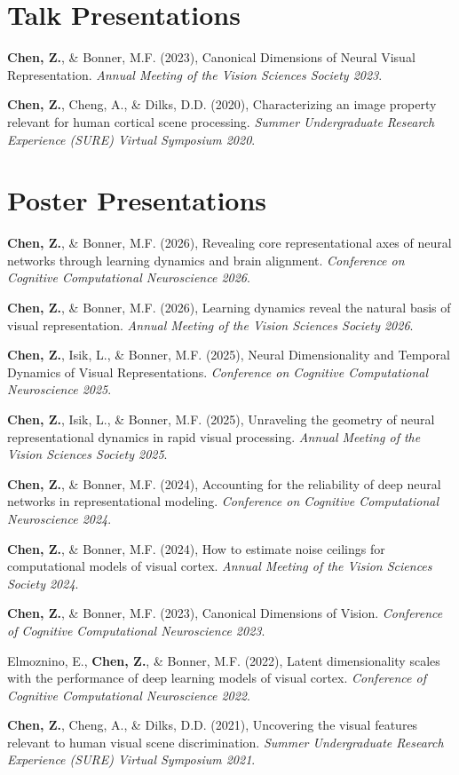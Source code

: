 \documentclass[10pt,letterpaper]{article}
\newcommand{\cit}[1]{\begingroup\hangindent=0.32in\hangafter=1 #1\par\endgroup\vspace{3pt}}
\begin{document}
\section{Talk Presentations}
\cit{\textbf{Chen, Z.}, \& Bonner, M.F. (2023), Canonical Dimensions of Neural Visual Representation. \textit{Annual Meeting of the Vision Sciences Society 2023}.}
\cit{\textbf{Chen, Z.}, Cheng, A., \& Dilks, D.D. (2020), Characterizing an image property relevant for human cortical scene processing. \textit{Summer Undergraduate Research Experience (SURE) Virtual Symposium 2020}.}

\section{Poster Presentations}
\cit{\textbf{Chen, Z.}, \& Bonner, M.F. (2026), Revealing core representational axes of neural networks through learning dynamics and brain alignment. \textit{Conference on Cognitive Computational Neuroscience 2026}.}
\cit{\textbf{Chen, Z.}, \& Bonner, M.F. (2026), Learning dynamics reveal the natural basis of visual representation. \textit{Annual Meeting of the Vision Sciences Society 2026}.}
\cit{\textbf{Chen, Z.}, Isik, L., \& Bonner, M.F. (2025), Neural Dimensionality and Temporal Dynamics of Visual Representations. \textit{Conference on Cognitive Computational Neuroscience 2025}.}
\cit{\textbf{Chen, Z.}, Isik, L., \& Bonner, M.F. (2025), Unraveling the geometry of neural representational dynamics in rapid visual processing. \textit{Annual Meeting of the Vision Sciences Society 2025}.}
\cit{\textbf{Chen, Z.}, \& Bonner, M.F. (2024), Accounting for the reliability of deep neural networks in representational modeling. \textit{Conference on Cognitive Computational Neuroscience 2024}.}
\cit{\textbf{Chen, Z.}, \& Bonner, M.F. (2024), How to estimate noise ceilings for computational models of visual cortex. \textit{Annual Meeting of the Vision Sciences Society 2024}.}
\cit{\textbf{Chen, Z.}, \& Bonner, M.F. (2023), Canonical Dimensions of Vision. \textit{Conference of Cognitive Computational Neuroscience 2023}.}
\cit{Elmoznino, E., \textbf{Chen, Z.}, \& Bonner, M.F. (2022), Latent dimensionality scales with the performance of deep learning models of visual cortex. \textit{Conference of Cognitive Computational Neuroscience 2022}.}
\cit{\textbf{Chen, Z.}, Cheng, A., \& Dilks, D.D. (2021), Uncovering the visual features relevant to human visual scene discrimination. \textit{Summer Undergraduate Research Experience (SURE) Virtual Symposium 2021}.}
\end{document}
